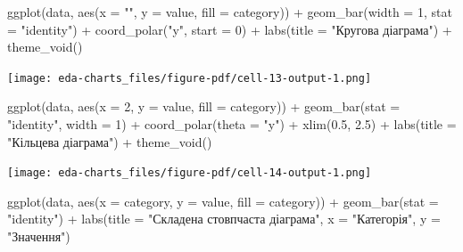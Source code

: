 \documentclass[
  letterpaper,
  DIV=11,
  numbers=noendperiod]{scrreprt}
\newenvironment{Shaded}{\begin{snugshade}}{\end{snugshade}}
\newcommand{\AttributeTok}[1]{\textcolor[rgb]{0.40,0.45,0.13}{#1}}
\newcommand{\DecValTok}[1]{\textcolor[rgb]{0.68,0.00,0.00}{#1}}
\newcommand{\FloatTok}[1]{\textcolor[rgb]{0.68,0.00,0.00}{#1}}
\newcommand{\FunctionTok}[1]{\textcolor[rgb]{0.28,0.35,0.67}{#1}}
\newcommand{\NormalTok}[1]{\textcolor[rgb]{0.00,0.23,0.31}{#1}}
\newcommand{\SpecialCharTok}[1]{\textcolor[rgb]{0.37,0.37,0.37}{#1}}
\newcommand{\StringTok}[1]{\textcolor[rgb]{0.13,0.47,0.30}{#1}}
\begin{document}
\begin{Shaded}
\begin{Highlighting}[]
\FunctionTok{ggplot}\NormalTok{(data, }\FunctionTok{aes}\NormalTok{(}\AttributeTok{x =} \StringTok{""}\NormalTok{, }\AttributeTok{y =}\NormalTok{ value, }\AttributeTok{fill =}\NormalTok{ category)) }\SpecialCharTok{+}
  \FunctionTok{geom\_bar}\NormalTok{(}\AttributeTok{width =} \DecValTok{1}\NormalTok{, }\AttributeTok{stat =} \StringTok{"identity"}\NormalTok{) }\SpecialCharTok{+}
  \FunctionTok{coord\_polar}\NormalTok{(}\StringTok{"y"}\NormalTok{, }\AttributeTok{start =} \DecValTok{0}\NormalTok{) }\SpecialCharTok{+}
  \FunctionTok{labs}\NormalTok{(}\AttributeTok{title =} \StringTok{"Кругова діаграма"}\NormalTok{) }\SpecialCharTok{+}
  \FunctionTok{theme\_void}\NormalTok{()}
\end{Highlighting}
\end{Shaded}

\texttt{[image: eda-charts\_files/figure-pdf/cell-13-output-1.png]}

\begin{Shaded}
\begin{Highlighting}[]
\FunctionTok{ggplot}\NormalTok{(data, }\FunctionTok{aes}\NormalTok{(}\AttributeTok{x =} \DecValTok{2}\NormalTok{, }\AttributeTok{y =}\NormalTok{ value, }\AttributeTok{fill =}\NormalTok{ category)) }\SpecialCharTok{+}
  \FunctionTok{geom\_bar}\NormalTok{(}\AttributeTok{stat =} \StringTok{"identity"}\NormalTok{, }\AttributeTok{width =} \DecValTok{1}\NormalTok{) }\SpecialCharTok{+}
  \FunctionTok{coord\_polar}\NormalTok{(}\AttributeTok{theta =} \StringTok{"y"}\NormalTok{) }\SpecialCharTok{+}
  \FunctionTok{xlim}\NormalTok{(}\FloatTok{0.5}\NormalTok{, }\FloatTok{2.5}\NormalTok{) }\SpecialCharTok{+}
  \FunctionTok{labs}\NormalTok{(}\AttributeTok{title =} \StringTok{"Кільцева діаграма"}\NormalTok{) }\SpecialCharTok{+}
  \FunctionTok{theme\_void}\NormalTok{()}
\end{Highlighting}
\end{Shaded}

\texttt{[image: eda-charts\_files/figure-pdf/cell-14-output-1.png]}

\begin{Shaded}
\begin{Highlighting}[]
\FunctionTok{ggplot}\NormalTok{(data, }\FunctionTok{aes}\NormalTok{(}\AttributeTok{x =}\NormalTok{ category, }\AttributeTok{y =}\NormalTok{ value, }\AttributeTok{fill =}\NormalTok{ category)) }\SpecialCharTok{+}
  \FunctionTok{geom\_bar}\NormalTok{(}\AttributeTok{stat =} \StringTok{"identity"}\NormalTok{) }\SpecialCharTok{+}
  \FunctionTok{labs}\NormalTok{(}\AttributeTok{title =} \StringTok{"Складена стовпчаста діаграма"}\NormalTok{, }\AttributeTok{x =} \StringTok{"Категорія"}\NormalTok{, }\AttributeTok{y =} \StringTok{"Значення"}\NormalTok{)}
\end{Highlighting}
\end{Shaded}
\end{document}
